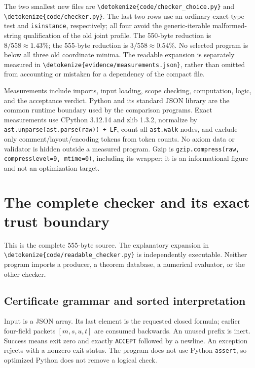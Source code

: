 \documentclass[11pt,letterpaper]{article}
\theoremstyle{definition}\newtheorem{definition}[theorem]{Definition}
\theoremstyle{remark}\newtheorem{remark}[theorem]{Remark}
\newcommand{\file}[1]{\expandafter\nolinkurl\expandafter{\detokenize{#1}}}
\begin{document}
The two smallest new files are \file{code/checker_choice.py} and
\file{code/checker.py}. The last two rows use an ordinary exact-type test
and \texttt{isinstance}, respectively; all four avoid the generic-iterable
malformed-string qualification of the old joint profile. The 550-byte
reduction is $8/558\approx1.43\%$; the 555-byte reduction is
$3/558\approx0.54\%$. No selected program is below all three old
coordinate minima. The readable expansion is separately measured in
\file{evidence/measurements.json}, rather than omitted from accounting or
mistaken for a dependency of the compact file.

Measurements include imports, input loading, scope checking, computation,
logic, and the acceptance verdict. Python and its standard JSON library
are the common runtime boundary used by the comparison programs. Exact
measurements use CPython 3.12.14 and zlib 1.3.2, normalize by
\texttt{ast.unparse(ast.parse(raw)) + LF}, count all \texttt{ast.walk}
nodes, and exclude only comment/layout/encoding tokens from token counts.
No axiom data or validator is hidden outside a measured program.
Gzip is \texttt{gzip.compress(raw, compresslevel=9, mtime=0)}, including
its wrapper; it is an informational figure and not an optimization target.



\section{The complete checker and its exact trust boundary}
\label{sec:executable}

This is the complete 555-byte source. The explanatory expansion in
\file{code/readable_checker.py} is independently executable. Neither
program imports a producer, a theorem database, a numerical evaluator,
or the other checker.



\subsection{Certificate grammar and sorted interpretation}

Input is a JSON array. Its last element is the requested closed formula;
earlier four-field packets $[m,s,u,t]$ are consumed backwards. An unused
prefix is inert. Success means exit zero and exactly \texttt{ACCEPT}
followed by a newline. An exception rejects with a nonzero exit status.
The program does not use Python \texttt{assert}, so optimized Python
does not remove a logical check.
\end{document}
